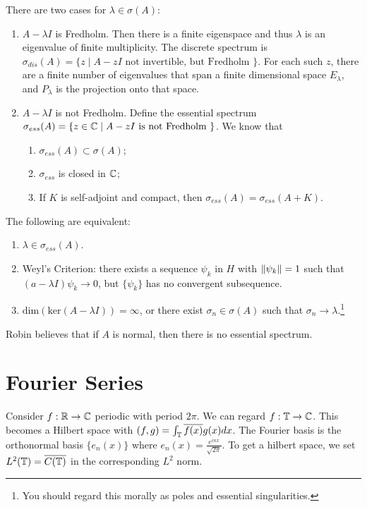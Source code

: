 \documentclass[10pt, twoside]{article}
\begin{document}
    There are two cases for $\lambda \in \sigma(A)$: \begin{enumerate} \item
        $A-\lambda I$ is Fredholm. Then there is a finite eigenspace and thus
        $\lambda$ is an eigenvalue of finite multiplicity. The discrete
        spectrum is $\sigma_{dis}(A) = \{z \mid A-zI \text{ not invertible, but
        Fredholm } \}.$ For each such $z$, there are a finite number of
        eigenvalues that span a finite dimensional space $E_{\lambda}$, and
        $P_{\lambda}$ is the projection onto that space.  \item $A-\lambda I$
        is not Fredholm. Define the essential spectrum $\sigma_{ess}(A) = \{z
        \in \mathbb{C} \mid A-zI \text{ is not Fredholm } \}$. We know that
        \begin{enumerate} \item $\sigma_{ess}(A) \subset \sigma(A)$; \item
        $\sigma_{ess}$ is closed in $\mathbb{C}$; \item If $K$ is self-adjoint and
compact, then $\sigma_{ess}(A) = \sigma_{ess}(A+K)$.  \end{enumerate}
\end{enumerate}

    \begin{thm} The following are equivalent: \begin{enumerate} \item $\lambda
        \in \sigma_{ess}(A)$.  \item Weyl's Criterion: there exists a sequence
        $\psi_k$ in $H$ with $\lVert\psi_k\rVert = 1$ such that $(a-\lambda I)
        \psi_k \to 0$, but $\{\psi_k\}$ has no convergent subsequence.  \item
        $\mathrm{dim}(\mathrm{ker}(A-\lambda I)) = \infty$, or there exist
        $\sigma_n \in \sigma(A)$ such that $\sigma_n \to \lambda$.\footnote{You
        should regard this morally as poles and essential singularities.}
\end{enumerate} \end{thm}

    \begin{rmk} Robin believes that if $A$ is normal, then there is no
    essential spectrum.  \end{rmk}

    \section{Fourier Series} Consider $f:\mathbb{R} \to \mathbb{C}$ periodic with period $2
    \pi$. We can regard $f: \mathbb{T} \to \mathbb{C}$. This becomes a Hilbert space
    with $(f,g) = \int_{\mathbb{T}} \overline{f(x)}g(x) dx$. The Fourier basis is the
    orthonormal basis $\{e_n(x)\}$ where $e_n(x) = \frac{e^{inx}}{\sqrt{2
    \pi}}$. To get a hilbert space, we set $L^2(\mathbb{T}) = \overline{C(\mathbb{T})}$ in the
    corresponding $L^2$ norm.
\end{document}
